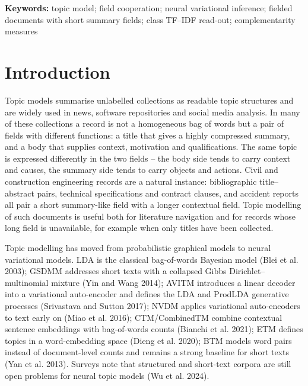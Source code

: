 \documentclass[Journal,letterpaper,NoLists]{ascelike-new}
\begin{document}
\noindent\textbf{Keywords:} topic model; field cooperation; neural variational inference; fielded documents with short summary fields; class TF--IDF read-out; complementarity measures

\section{Introduction}

Topic models summarise unlabelled collections as readable topic structures and are widely used in
news, software repositories and social media analysis. In many of these collections a record is not
a homogeneous bag of words but a pair of fields with different functions: a title that gives a
highly compressed summary, and a body that supplies context, motivation and qualifications. The
same topic is expressed differently in the two fields -- the body side tends to carry context and
causes, the summary side tends to carry objects and actions. Civil and construction engineering
records are a natural instance: bibliographic title--abstract pairs, technical specifications and
contract clauses, and accident reports all pair a short summary-like field with a longer contextual
field. Topic modelling of such documents is useful both for literature navigation and for records
whose long field is unavailable, for example when only titles have been collected.

Topic modelling has moved from probabilistic graphical models to neural variational models. LDA is
the classical bag-of-words Bayesian model (Blei et al. 2003); GSDMM addresses short texts with a
collapsed Gibbs Dirichlet--multinomial mixture (Yin and Wang 2014); AVITM introduces a linear
decoder into a variational auto-encoder and defines the LDA and ProdLDA generative processes
(Srivastava and
  Sutton 2017); NVDM applies variational auto-encoders to text early on
(Miao et al. 2016); CTM/CombinedTM combine contextual sentence embeddings with bag-of-words
counts (Bianchi et al. 2021); ETM defines topics in a word-embedding space (Dieng et al. 2020);
BTM models word pairs instead of document-level counts and remains a strong baseline for short
texts (Yan et al. 2013). Surveys note that structured and short-text corpora are still open
problems for neural topic models (Wu et al. 2024).
\end{document}
